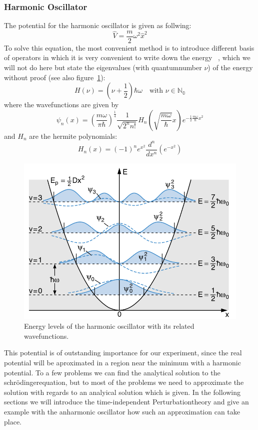 \subsubsection{Harmonic Oscillator}
The potential for the harmonic oscillator is given as follwing:
\begin{equation}
    \hat{V}= \frac{m}{2} \omega^2 \hat{x}^2
\end{equation}
To solve this equation, the most convenient method is to
introduce different basis of operators in which it is very
convenient to write down the energy
~\cite{fliessbach2008quantenmechanik}, which we will not do here
but state the eigenvalues (with quantumnumber $\nu$)
of the energy without proof
(see also figure~\ref{fig:harmonic1}):
\begin{equation}
    H(\nu) = \left ( \nu + \frac{1}{2} \right )\hbar \omega 
    \quad \text{with $\nu\in \mathbb{N_0}$}
\end{equation}
where the wavefunctions
   are given by
   \begin{equation}
    \psi_n(x)= \left(\frac{m\omega}{\pi\hbar}
    \right)^\frac{1}{4}
\frac{1}{\sqrt{2^nn!}} H_n
\left(\sqrt{\frac{m\omega}{\hbar}} x \right)
e^{-\frac{1}{2}\frac{m\omega}{\hbar}x^2}
\end{equation}
and $H_n$ are the hermite polynomials: 
\begin{equation}
H_n(x)=(-1)^n e^{x^2}\frac{d^n}{dx^n}\left(e^{-x^2}\right) 
\end{equation}
\begin{figure}
\includegraphics[width=15cm]{pics/harmonic1}
\caption{Energy levels of the harmonic oscillator with its 
    related wavefunctions\cite{Demtroeder1}.}
\label{fig:harmonic1}
\end{figure}
This potential is of outstanding importance for our experiment,
since the real potential will be aproximated in a region near
the minimum with a harmonic potential. 
To a few problems we can find the analytical solution
to the schrödingerequation, but to most
of the problems we need to approximate the solution with regards to an analyical
solution which is given. In the following sections we will introduce
the time-independent Perturbationtheory and give an example with the 
anharmonic oscillator how such an approximation can take place.
